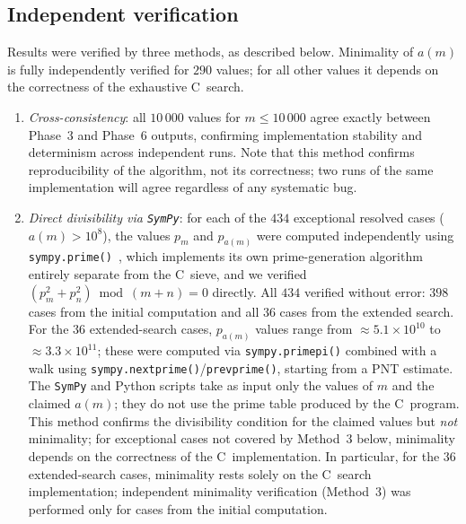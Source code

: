\documentclass[12pt]{article}
\begin{document}
	\subsection{Independent verification}
	\label{sec:verification}
	
	Results were verified by three methods, as described below.
	Minimality of $a(m)$ is fully independently verified for $290$
	values; for all other values it depends on the correctness of the
	exhaustive C~search.
	
	\begin{enumerate}
		\item \emph{Cross-consistency}: all $10\,000$ values for
		$m \leq 10\,000$ agree exactly between Phase~3 and Phase~6 outputs,
		confirming implementation stability and determinism across
		independent runs.
		Note that this method confirms reproducibility of the algorithm,
		not its correctness; two runs of the same implementation will
		agree regardless of any systematic bug.
		\item \emph{Direct divisibility via \texttt{SymPy}}: for each of the
		$434$ exceptional resolved cases ($a(m) > 10^8$), the values $p_m$
		and $p_{a(m)}$ were computed independently using
		\texttt{sympy.prime()}~\cite{SymPy}, which implements its own
		prime-generation algorithm entirely separate from the C~sieve, and
		we verified $(p_m^2 + p_n^2) \bmod (m+n) = 0$ directly.
		All $434$ verified without error: $398$ cases from the initial
		computation and all $36$ cases from the extended search.
		For the $36$ extended-search cases, $p_{a(m)}$ values range from
		$\approx 5.1 \times 10^{10}$ to $\approx 3.3 \times 10^{11}$;
		these were computed via \texttt{sympy.primepi()} combined with a
		walk using \texttt{sympy.nextprime()}/\texttt{prevprime()}, starting
		from a PNT estimate.
		The \texttt{SymPy} and Python scripts take as input only the values
		of $m$ and the claimed $a(m)$; they do not use the prime table
		produced by the C~program.
		This method confirms the divisibility condition for the claimed
		values but \emph{not} minimality; for exceptional cases not covered
		by Method~3 below, minimality depends on the correctness of the
		C~implementation.
		In particular, for the $36$ extended-search cases, minimality rests
		solely on the C~search implementation; independent minimality
		verification (Method~3) was performed only for cases from the
		initial computation.

\end{enumerate}
\end{document}
